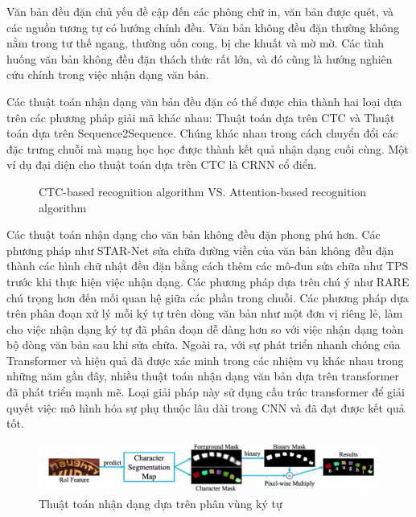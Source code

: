 Văn bản đều đặn chủ yếu đề cập đến các phông chữ in, văn bản được quét, và các nguồn tương tự có hướng chính đều. Văn bản không đều đặn thường không nằm trong tư thế ngang, thường uốn cong, bị che khuất và mờ mờ. Các tình huống văn bản không đều đặn thách thức rất lớn, và đó cũng là hướng nghiên cứu chính trong việc nhận dạng văn bản.

Các thuật toán nhận dạng văn bản đều đặn có thể được chia thành hai loại dựa trên các phương pháp giải mã khác nhau: Thuật toán dựa trên CTC và Thuật toán dựa trên Sequence2Sequence. Chúng khác nhau trong cách chuyển đổi các đặc trưng chuỗi mà mạng học học được thành kết quả nhận dạng cuối cùng. Một ví dụ đại diện cho thuật toán dựa trên CTC là CRNN cổ điển.

\begin{figure}[p]
    
    \centering
    \caption{CTC-based recognition algorithm VS. Attention-based recognition algorithm}
\end{figure}

Các thuật toán nhận dạng cho văn bản không đều đặn phong phú hơn. Các phương pháp như STAR-Net sửa chữa đường viền của văn bản không đều đặn thành các hình chữ nhật đều đặn bằng cách thêm các mô-đun sửa chữa như TPS trước khi thực hiện việc nhận dạng. Các phương pháp dựa trên chú ý như RARE chú trọng hơn đến mối quan hệ giữa các phần trong chuỗi. Các phương pháp dựa trên phân đoạn xử lý mỗi ký tự trên dòng văn bản như một đơn vị riêng lẻ, làm cho việc nhận dạng ký tự đã phân đoạn dễ dàng hơn so với việc nhận dạng toàn bộ dòng văn bản sau khi sửa chữa. Ngoài ra, với sự phát triển nhanh chóng của Transformer và hiệu quả đã được xác minh trong các nhiệm vụ khác nhau trong những năm gần đây, nhiều thuật toán nhận dạng văn bản dựa trên transformer đã phát triển mạnh mẽ. Loại giải pháp này sử dụng cấu trúc transformer để giải quyết việc mô hình hóa sự phụ thuộc lâu dài trong CNN và đã đạt được kết quả tốt.

\begin{figure}
    \includegraphics[scale=0.37]{chapter2/images/recognition-based-charcter-segmentation.png}
    \centering
    \caption{Thuật toán nhận dạng dựa trên phân vùng ký tự}
\end{figure}

